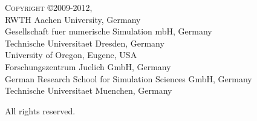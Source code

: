 \textsc{\Large Copyright \copyright 2009-2012,} \\ \hspace*{10mm}
   RWTH Aachen University, Germany \\ \hspace*{10mm}
   Gesellschaft fuer numerische Simulation mbH, Germany \\ \hspace*{10mm}
   Technische Universitaet Dresden, Germany \\ \hspace*{10mm}
   University of Oregon, Eugene, USA \\ \hspace*{10mm}
   Forschungszentrum Juelich GmbH, Germany \\ \hspace*{10mm}
   German Research School for Simulation Sciences GmbH, Germany \\ \hspace*{10mm}
   Technische Universitaet Muenchen, Germany

All rights reserved.
\vfill

